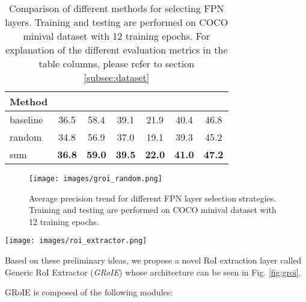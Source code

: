 \documentclass[10pt,conference,a4paper]{IEEEtran}
\begin{document}
\begin{table}
	\begin{center}
		\begin{tabular}{l|c|c|c|c|c|c}
			Method &  &  & 	&  &  &  \\
			\hline\hline
			baseline \cite{lin2017feature} & 36.5 & 58.4 & 39.1 & 21.9 & 40.4 & 46.8 \\
			random    & 34.8 & 56.9 & 37.0 & 19.1 & 39.3 & 45.2 \\
			sum       & \textbf{36.8} & \textbf{59.0} & \textbf{39.5} & \textbf{22.0} & \textbf{41.0} & \textbf{47.2} \\
		\end{tabular}
	\end{center}
	\caption{Comparison of different methods for selecting FPN layers. Training and testing are performed on COCO minival dataset with 12 training epochs. For explanation of the different evaluation metrics in the table columns, please refer to section \ref{subsec:dataset}}
	\label{groi-compare-random-select}
\end{table}

\begin{figure}[b!]
	\begin{center}
		\texttt{[image: images/groi\_random.png]}
	\end{center}
	\caption{Average precision trend for different FPN layer selection strategies. Training and testing are performed on COCO minival dataset with 12 training epochs.}
	\label{fig:groi_random}
\end{figure}

\begin{figure*}[thb]
	\begin{center}
	\texttt{[image: images/roi\_extractor.png]}
	\end{center}
	\caption{Generic RoI Extraction framework. (1) RoI Pooler. (2) Preprocessing phase. (3) Aggregation function. (4) Post-processing phase.}
	\label{fig:groi}
\end{figure*}

Based on these preliminary ideas, we propose a novel RoI extraction layer called Generic RoI Extractor (\emph{GRoIE}) whose architecture can be seen in Fig. \ref{fig:groi}.

GRoIE is composed of the following modules:
\end{document}
